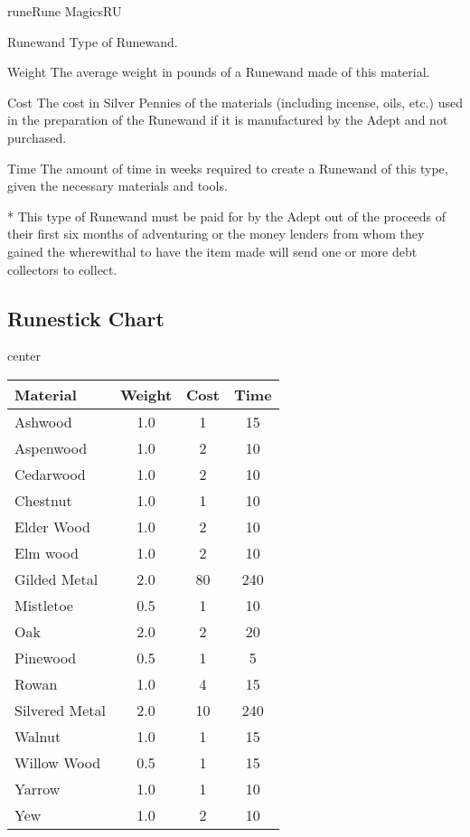 \begin{college}[1.1]{rune}{Rune Magics}{RU}
\begin{Description}
\item[Runewand]
Type of Runewand.
\item[Weight]
The average weight in pounds of a Runewand made of this material.

\item[Cost]
The cost in Silver Pennies of the materials (including incense, oils,
etc.) used in the preparation of the Runewand if it is manufactured by
the Adept and not purchased.

\item[Time]
The amount of time in weeks required to create a Runewand of this
type, given the necessary materials and tools.
\end{Description}

* This type of Runewand must be paid for by the Adept out of the
proceeds of their first six months of adventuring or the money lenders
from whom they gained the wherewithal to have the item made will send
one or more debt collectors to collect.

\subsection{Runestick Chart}
\label{rune:runesticktable}

\begin{inset}{\small}{center}
\begin{tabular}{lccc}
Material	& Weight & Cost & Time \\ \hline
Ashwood		& 1.0	& 1	& 15 \\
Aspenwood	& 1.0	& 2	& 10 \\
Cedarwood	& 1.0	& 2	& 10 \\
Chestnut	& 1.0	& 1	& 10 \\
Elder Wood	& 1.0	& 2	& 10 \\
Elm wood	& 1.0	& 2	& 10 \\
Gilded Metal	& 2.0	& 80	& 240 \\
Mistletoe	& 0.5	& 1	& 10 \\
Oak		& 2.0	& 2	& 20 \\
Pinewood	& 0.5	& 1	& 5 \\
Rowan		& 1.0	& 4	& 15 \\
Silvered Metal	& 2.0	& 10	& 240 \\
Walnut		& 1.0	& 1	& 15 \\
Willow Wood	& 0.5	& 1	& 15 \\
Yarrow		& 1.0	& 1	& 10 \\
Yew		& 1.0	& 2	& 10 \\
\end{tabular}
\end{inset}


\end{college}
